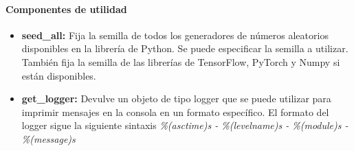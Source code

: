 \paragraph{Componentes de utilidad}
\begin{itemize}
    \item \textbf{seed\_all:} Fija la semilla de todos los generadores de números aleatorios
    disponibles en la librería de Python. Se puede especificar la semilla a utilizar. También
    fija la semilla de las librerías de TensorFlow, PyTorch y Numpy si están disponibles.
    \item \textbf{get\_logger:} Devulve un objeto de tipo logger que se puede utilizar para
    imprimir mensajes en la consola en un formato específico. El formato del logger sigue la
    siguiente sintaxis \textit{\%(asctime)s - \%(levelname)s - \%(module)s - \%(message)s} 
\end{itemize}    
